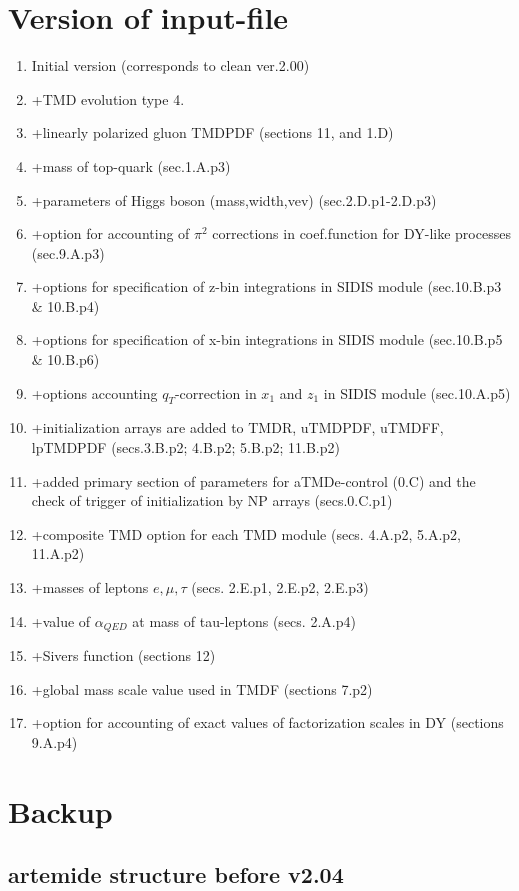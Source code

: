 \documentclass[prd,nofootinbib,eqsecnum,final]{revtex4}
\renewcommand{\(}{\left(}
\renewcommand{\)}{\right)}
\renewcommand{\[}{\left[}
\renewcommand{\]}{\right]}
\begin{document}
\section{Version of input-file}
\begin{enumerate}
\item Initial version (corresponds to clean ver.2.00)
\item +TMD evolution type 4.
\item +linearly polarized gluon TMDPDF (sections 11, and 1.D)
\item +mass of top-quark (sec.1.A.p3)
\item +parameters of Higgs boson (mass,width,vev) (sec.2.D.p1-2.D.p3)
\item +option for accounting of $\pi^2$ corrections in coef.function for DY-like processes (sec.9.A.p3)
\item +options for specification of z-bin integrations in SIDIS module (sec.10.B.p3 \& 10.B.p4)
\item +options for specification of x-bin integrations in SIDIS module (sec.10.B.p5 \& 10.B.p6)
\item +options accounting $q_T$-correction in $x_1$ and $z_1$ in SIDIS module (sec.10.A.p5)
\item +initialization arrays are added to TMDR, uTMDPDF, uTMDFF, lpTMDPDF (secs.3.B.p2; 4.B.p2; 5.B.p2; 11.B.p2)
\item +added primary section of parameters for aTMDe-control (0.C) and the check of trigger of initialization by NP arrays (secs.0.C.p1)
\item +composite TMD option for each TMD module (secs. 4.A.p2, 5.A.p2, 11.A.p2)
\item +masses of leptons $e,\mu,\tau$ (secs. 2.E.p1, 2.E.p2, 2.E.p3)
\item +value of $\alpha_{QED}$ at mass of tau-leptons (secs. 2.A.p4)
\item +Sivers function (sections 12)
\item +global mass scale value used in TMDF (sections 7.p2)
\item +option for accounting of exact values of factorization scales in DY (sections 9.A.p4)
\end{enumerate}

\newpage
\section{Backup}

\subsection{artemide structure before v2.04}
\end{document}
